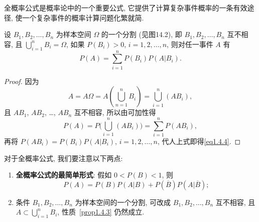 全概率公式是概率论中的一个重要公式,
它提供了计算复杂事件概率的一条有效途径,
使一个复杂事件的概率计算问题化繁就简.
\begin{property}[全概率公式]\label{prop1.4.3}
  设 $B_1, B_2, \dotsc, B_n$ 为样本空间 $\Omega$ 的一个分割 (见图14.2),
  即 $B_1, B_2, \dotsc, B_n$ 互不相容,
  且 $\bigcup _{i=1} ^n B_i = \Omega$,
  如果 $P(B_i) > 0$, $i=1, 2, \dotsc, n$,
  则对任一事件 $A$ 有
  \begin{equation}
    P(A) = \sum_{i=1}^n P(B_i) P(A | B_i).
    \label{eq1.4.4}
  \end{equation}
\end{property}

\begin{proof}
  因为
  \[
    A = A\Omega = A (\bigcup _{n=1} ^n B_i) = \bigcup _{i=1} ^n (A B_i),
  \]
  且 $AB_1$, $AB_2$, \dots, $AB_n$ 互不相容,
  所以由可加性得
  \[
    P(A) = P \biggl( \bigcup_{i=1}^n (AB_i) \biggr) = \sum_{i=1}^n P (AB_i),
  \]
  再将 $P(AB_i) = P(B_i) P(A|B_i)$, $i=1,2,\dotsc,n$,
  代人上式即得\eqref{eq1.4.4}.
\end{proof}

对于全概率公式,
我们要注意以下两点:
\begin{enumerate}
  \item \textbf{全概率公式的最简单形式}:
  假如 $0 < P(B) < 1$,
  则
  \begin{equation}
    P(A) = P(B) P(A|B) + P(\overline{B}) P(A|\overline{B});
    \label{eq1.4.5}
  \end{equation}
  \item 条件 $B_1, B_2, \dotsc, B_n$ 为样本空间的一个分割,
  可改成 $B_1, B_2, \dotsc, B_n$ 互不相容,
  且 $A \subset \bigcup _{i=1}^n B_i$,
  性质~\ref{prop1.4.3} 仍然成立.
\end{enumerate}

